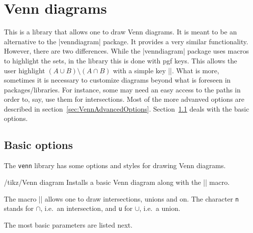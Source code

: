\documentclass[a4paper]{ltxdoc}
\begin{document}
\section{Venn diagrams}
\begin{codeexample}
\usetikzlibrary{venn}
\end{codeexample}

This is a library that allows one to draw Venn diagrams. It is meant to be an
alternative to the |venndiagram| package. It provides a very similar
functionality. However, there are two differences. While the |venndiagram|
package uses macros to highlight the sets, in the library this is done with pgf
keys. This allows the user highlight $(A\cup B)\setminus(A\cap B)$ with a simple
key ||. What is more, sometimes it is necessary to
customize diagrams beyond what is foreseen in packages/libraries. For instance,
some may need an easy access to the paths in order to, say, use them for
intersections. Most of the more advanved options are described in
section~\ref{sec:VennAdvancedOptions}. Section~\ref{sec:VennBasicOptions} deals
with the basic options.

\subsection{Basic options}
\label{sec:VennBasicOptions}

The \texttt{venn} library has some options and styles for drawing Venn diagrams.
\begin{key}{/tikz/Venn diagram}
        Installs a basic Venn diagram along with the |\Venn| macro.
\end{key}

The macro |\Venn| allows one to draw intersections, unions and on. The character
\texttt{n} stands for $\cap$, i.e.\ an intersection, and \texttt{u} for $\cup$,
i.e.\ a union.

\begin{codeexample}[width=5cm]
\end{codeexample}

The most basic parameters are listed next.
\end{document}
